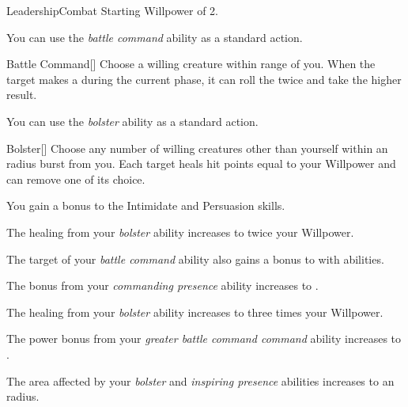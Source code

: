     \begin{feat}{Leadership}{Combat}
        \featpre Starting Willpower of 2.

         You can use the \textit{battle command} ability as a standard action.
        \begin{freeability}{Battle Command}[]
            Choose a willing creature within \rngmed range of you.
            When the target makes a  during the current phase, it can roll the  twice and take the higher result.
        \end{freeability}

         You can use the \textit{bolster} ability as a standard action.
        \begin{apability}{Bolster}[]
            Choose any number of willing creatures other than yourself within an \areamed radius burst from you.
            Each target heals hit points equal to your Willpower and can remove one  of its choice.
        \end{apability}

         You gain a  bonus to the Intimidate and Persuasion skills.

         The healing from your \textit{bolster} ability increases to twice your Willpower.

         The target of your \textit{battle command} ability also gains a  bonus to  with  abilities.

         The bonus from your \textit{commanding presence} ability increases to .

         The healing from your \textit{bolster} ability increases to three times your Willpower.

         The power bonus from your \textit{greater battle command command} ability increases to .

         The area affected by your \textit{bolster} and \textit{inspiring presence} abilities increases to an \areahuge radius.
    \end{feat}


